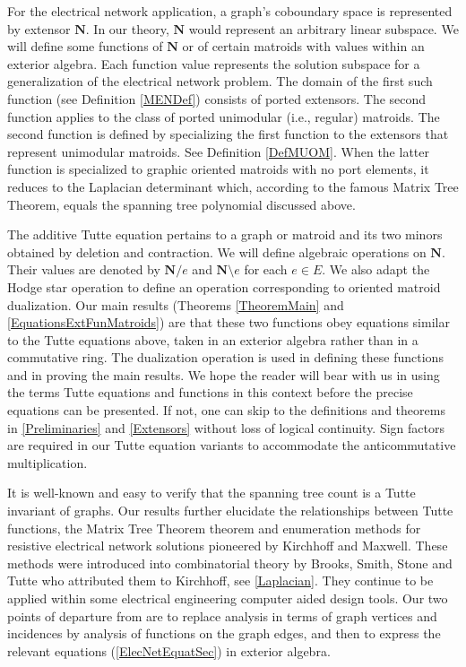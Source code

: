 \documentclass[12pt]{article}
\theoremstyle{definition}
\newcommand{\ext}[1]{\ensuremath{\mathbf{#1}}}
\begin{document}
For the electrical network application, a graph's coboundary space
is represented by extensor $\ext{N}$.  In our theory,
$\ext{N}$ would represent an arbitrary linear subspace.
We will define some functions of $\ext{N}$ or of certain
matroids with values within an exterior algebra.  
Each function value represents
the solution subspace for a generalization of the electrical network 
problem.
The domain of the first such function 
(see Definition \ref{MENDef})
consists of ported extensors.  
The second function applies to the class of ported unimodular
(i.e., regular) matroids.  The second function is defined by
specializing the first function to the extensors that represent
unimodular matroids.  See Definition \ref{DefMUOM}.
When the latter function is specialized to graphic oriented matroids with no
port elements, it reduces to the Laplacian determinant which, according to
the famous Matrix Tree Theorem, equals the spanning tree polynomial
discussed above.

The additive Tutte equation pertains to a graph or matroid and its
two minors obtained by deletion and contraction.  We will define algebraic 
operations on $\ext{N}$.
Their values are
denoted by $\ext{N}/e$ and $\ext{N}\setminus e$ for each $e\in E$.
We also adapt the Hodge star operation to define an operation corresponding
to oriented matroid dualization.
Our main results (Theorems \ref{TheoremMain} and \ref{EquationsExtFunMatroids})
are that these two functions obey equations similar to the 
Tutte equations above, taken in an exterior algebra rather than in
a commutative ring.  The dualization operation is used in defining
these functions and in proving the main results.
We hope the reader will bear with us in
using the terms Tutte equations and functions in this context 
before the precise equations can be presented.
If not, one can skip to the definitions and theorems in 
\textsection \ref{Preliminaries} 
and \textsection \ref{Extensors} without loss of logical continuity.
Sign factors are required in our Tutte equation variants
to accommodate the anticommutative multiplication.

It is well-known and easy to verify
that the spanning tree count is a Tutte invariant of graphs.  
Our results 
further elucidate the relationships between Tutte functions,
the Matrix Tree Theorem theorem and 
enumeration methods
for resistive electrical network solutions
pioneered by Kirchhoff\cite{Kirchhoff} and 
Maxwell\cite{MaxwellsFramesPaper}.  
These methods were introduced into combinatorial theory
by Brooks, Smith, Stone and Tutte\cite{BSST,TutteBook} who attributed
them to Kirchhoff, see \textsection \ref{Laplacian}.  
They continue to be applied
within some electrical engineering computer aided
design tools\cite{someEEBooks}.
Our two points of departure from \cite{BSST} are to 
replace analysis in terms of graph vertices and incidences
by analysis
of functions on the graph edges, and then to
express the relevant equations 
(\textsection \ref{ElecNetEquatSec}) in exterior algebra.
\end{document}
